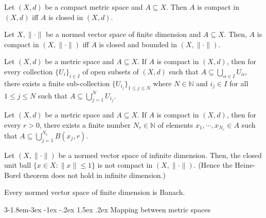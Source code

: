 \documentclass{tufte-handout}
\makeatletter
\renewcommand{\subsection}{\@startsection{subsection}%
    {3}{-1.8em}{-3ex \@plus -1ex \@minus -.2ex}%
    {1.5ex \@plus .2ex}
    {\hspace*{-5.5em}\fcolorbox{ltblue}{ltblue}{\parbox[c][1.0ex][b]{4em}{\phantom{space}}}
    \normalfont\large\itshape\color{ltblue}}}
\makeatother
\begin{document}
\begin{Proposition}
    Let \((X, d)\) be a compact metric space and \( A \subseteq X \). 
    Then \( A \) is compact in \( (X, d) \) iff \( A \) is closed in \( (X, d) \).
\end{Proposition}

\begin{Theorem}
    Let \(X, \|\cdot\|\) be a normed vector space of finite
    dimension and \( A \subseteq X \). 
    Then, \( A \) is compact in \( (X, \|\cdot\|) \) iff \( A \) is closed and bounded in \( (X, \|\cdot\|) \).
\end{Theorem}

\begin{Proposition}
    \hfill\newline
    Let \((X, d)\) be a metric space and \( A \subseteq X \). 
    If \( A \) is compact in \( (X, d) \), then for every collection 
    \(\{U_i\}_{i \in I}\) of open subsets of \( (X, d) \) such that \( A \subseteq \bigcup_{\alpha \in I} U_\alpha \),
    there exists a finite sub-collection \(\{U_{i_{j}}\}_{1 \leq j \leq N}\) where \( N \in \mathbb{N} \) and 
    \( i_j \in I \) for all \( 1 \leq j \leq N \) such that \( A \subseteq \bigcup_{j=1}^{N} U_{i_j} \).
\end{Proposition}


\begin{Corollary}
    Let \((X,d)\) be a metric space and \( A \subseteq X \). 
    If \( A \) is compact in \( (X, d) \), then for every \(r>0\), 
    there exists a finite number \(N_r \in \mathbb{N}\) of elements \( x_1, \cdots, x_{N_r} \in A \) such 
    that \( 
    A \subseteq \bigcup_{j=1}^{N_r} B(x_j, r)
    \).
\end{Corollary}

\begin{Corollary}
    Let \((X, \|\cdot\|)\) be a normed vector space of infinite dimension. 
    Then, the closed unit ball \( \{x \in X: \|x\| \leq 1\} \) is not compact in \( (X, \|\cdot\|) \).
    (Hence the Heine-Borel theorem does not hold in infinite dimension.)
\end{Corollary}

\begin{Proposition}
    Every normed vector space of finite dimension is Banach.
\end{Proposition}

\subsection{Mapping between metric spaces}
\end{document}
